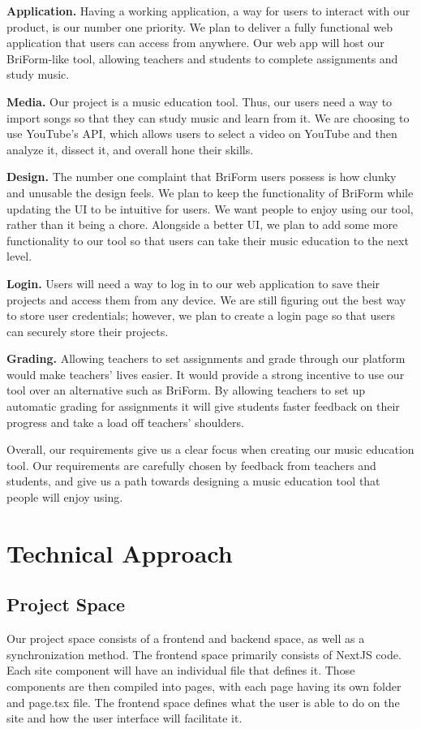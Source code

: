 \documentclass[12pt, letterpaper]{article}
\begin{document}
\textbf{Application.} Having a working application, a way for users to interact with our product, is our number one priority. We plan to deliver a fully functional web application that users can access from anywhere. Our web app will host our BriForm-like tool, allowing teachers and students to complete assignments and study music.

\textbf{Media.} Our project is a music education tool. Thus, our users need a way to import songs so that they can study music and learn from it. We are choosing to use YouTube's API, which allows users to select a video on YouTube and then analyze it, dissect it, and overall hone their skills.

\textbf{Design.} The number one complaint that BriForm users possess is how clunky and unusable the design feels. We plan to keep the functionality of BriForm while updating the UI to be intuitive for users. We want people to enjoy using our tool, rather than it being a chore. Alongside a better UI, we plan to add some more functionality to our tool so that users can take their music education to the next level.

\textbf{Login.} Users will need a way to log in to our web application to save their projects and access them from any device. We are still figuring out the best way to store user credentials; however, we plan to create a login page so that users can securely store their projects.

\textbf{Grading.} Allowing teachers to set assignments and grade through our platform would make teachers' lives easier. It would provide a strong incentive to use our tool over an alternative such as BriForm. By allowing teachers to set up automatic grading for assignments it will give students faster feedback on their progress and take a load off teachers’ shoulders.

Overall, our requirements give us a clear focus when creating our music education tool. Our requirements are carefully chosen by feedback from teachers and students, and give us a path towards designing a music education tool that people will enjoy using.

\section*{Technical Approach}
\subsection*{Project Space}
Our project space consists of a frontend and backend space, as well as a synchronization method. The frontend space primarily consists of NextJS code. Each site component will have an individual file that defines it. Those components are then compiled into pages, with each page having its own folder and page.tsx file. The frontend space defines what the user is able to do on the site and how the user interface will facilitate it. 
\end{document}
